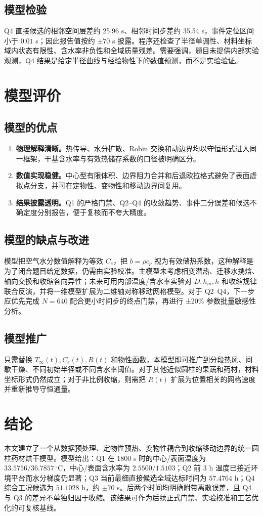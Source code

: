 \documentclass[withoutpreface,bwprint]{cumcmthesis}
\renewcommand{\textbf}[1]{{\song\bfseries #1}}
\begin{document}
\subsection{模型检验}
Q4 直接候选的相邻空间层差约 25.96 s、相邻时间步差约 35.54 s，事件定位区间小于 $0.01$ s；因此报告值按约 $\pm70$ s 披露。程序还检查了半径单调性、材料坐标域内状态有限性、含水率非负性和全域质量残差。需要强调，题目未提供内部实验观测，Q4 结果是给定半径曲线与经验物性下的数值预测，而不是实验验证。

\section{模型评价}
\subsection{模型的优点}
\begin{enumerate}
  \item \textbf{物理解释清晰。}热传导、水分扩散、Robin 交换和动边界均以守恒形式进入同一框架，干基含水率与有效热储存系数的口径被明确区分。
  \item \textbf{数值实现稳健。}中心型有限体积、边界阻力合并和后退欧拉格式避免了表面虚拟点分支，并可在定物性、变物性和移动边界间复用。
  \item \textbf{结果披露透明。}Q1 的严格门禁、Q2--Q4 的收敛趋势、事件二分误差和候选不确定度分别报告，便于复核而不夸大精度。
\end{enumerate}
\subsection{模型的缺点与改进}
模型把空气水分数值解释为等效 $C_e$，把 $b=\rho c_p$ 视为有效储热系数，这种解释是为了闭合题目给定数据，仍需由实验校准。主模型未考虑相变潜热、迁移水携焓、轴向交换和收缩各向异性；未来可用内部温度/含水率实验对 $D,h_m,h$ 和收缩规律联合反演，并将一维模型扩展为二维轴对称移动网格模型。对于 Q2--Q4，下一步应优先完成 $N=640$ 配合更小时间步的终点门禁，再进行 ±20\% 参数批量敏感性分析。
\subsection{模型推广}
只需替换 $T_\infty(t),C_e(t),R(t)$ 和物性函数，本模型即可推广到分段热风、间歇干燥、不同初始半径或不同含水率阈值。对于其他近似圆柱的果蔬和药材，材料坐标形式仍然成立；对于非比例收缩，则需把 $R(t)$ 扩展为位置相关的网格速度并重新推导守恒通量。

\section*{结论}
本文建立了一个从数据预处理、定物性预热、变物性耦合到收缩移动边界的统一圆柱药材烘干模型。模型给出：Q1 在 1800 s 时的中心/表面温度为 $33.5756/36.7857\,^{\circ}\mathrm{C}$，中心/表面含水率为 $2.5500/1.5103$；Q2 前 3 h 温度已接近环境平台而水分梯度仍显著；Q3 当前最细直接候选全域达标时间为 $57.4764$ h；Q4 综合工况候选为 $51.1028$ h，约 $\pm70$ s。后两个时间均明确附带离散误差，且 Q4 与 Q3 的差异不单独归因于收缩。该结果可作为后续正式门禁、实验校准和工艺优化的可复核基线。
\end{document}
